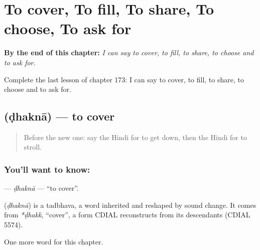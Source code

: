 
\chapter{To cover, To fill, To share, To choose, To ask for}
\label{ch:hi-to-cover-to-fill-to-share-to-choose-to-ask-for}

\begin{chapteropening}
\textbf{By the end of this chapter:} \emph{I can say to cover, to fill, to share, to choose and to ask for.}

Complete the last lesson of chapter 173: I can say to cover, to fill, to share, to choose and to ask for.
\end{chapteropening}

\section[\texorpdfstring{\hi{ढकना} (ḍhaknā)}{ढकना (ḍhaknā)}]{ (ḍhaknā) — to cover}

\label{lesson:HI-C173-dhakna}



\begin{quote}
Before the new one: say the Hindi for to get down, then the Hindi for to stroll.
\end{quote}

\subsection*{You'll want to know: }
\textbf{} — \emph{ḍhaknā} — \textquotedblleft{}to cover\textquotedblright{}.

\begin{cousinweb}
\textbf{} (\emph{ḍhaknā}) is a tadbhava, a word inherited and reshaped by sound change. It comes from \emph{*ḍhakk}, \textquotedblleft{}cover\textquotedblright{}, a form CDIAL reconstructs from its descendants (CDIAL 5574).
\end{cousinweb}

\begin{grammarlens}[title={What you've built}]
One more word for this chapter.
\end{grammarlens}

